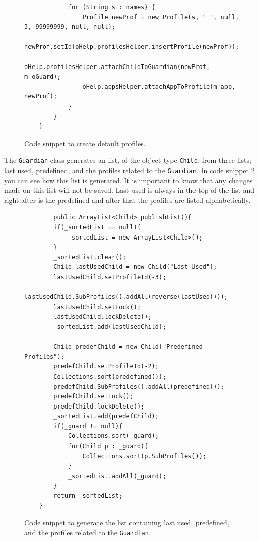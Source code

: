 \begin{description}
\begin{figure}[H]
\begin{lstlisting}
			for (String s : names) {
				Profile newProf = new Profile(s, " ", null, 3, 99999999, null, null);
				newProf.setId(oHelp.profilesHelper.insertProfile(newProf));
				oHelp.profilesHelper.attachChildToGuardian(newProf, m_oGuard);
				oHelp.appsHelper.attachAppToProfile(m_app, newProf);
			}
		}
	}
\end{lstlisting}
\caption{Code snippet to create default profiles.}%
\label{code:createChildren}%
\end{figure}

The \texttt{Guardian} class generates an list, of the object type \texttt{Child}, from three lists; last used, predefined, and the profiles related to the \texttt{Guardian}.
In code snippet \ref{code:publishList} you can see how this list is generated.
It is important to know that any changes made on this list will not be saved.
Last used is always in the top of the list and right after is the predefined and after that the profiles are listed alphabetically.
	
		\begin{figure}[H]
\begin{lstlisting}
		public ArrayList<Child> publishList(){
		if(_sortedList == null){
			_sortedList = new ArrayList<Child>();
		}
		_sortedList.clear();
		Child lastUsedChild = new Child("Last Used");
		lastUsedChild.setProfileId(-3);
		lastUsedChild.SubProfiles().addAll(reverse(lastUsed()));
		lastUsedChild.setLock();
		lastUsedChild.lockDelete();
		_sortedList.add(lastUsedChild);
		
		Child predefChild = new Child("Predefined Profiles");
		predefChild.setProfileId(-2);
		Collections.sort(predefined());
		predefChild.SubProfiles().addAll(predefined());
		predefChild.setLock();
		predefChild.lockDelete();
		_sortedList.add(predefChild);
		if(_guard != null){
			Collections.sort(_guard);
			for(Child p : _guard){
				Collections.sort(p.SubProfiles());
			}
			_sortedList.addAll(_guard);
		}
		return _sortedList;
	}
\end{lstlisting}
\caption{Code snippet to generate the list containing last used, predefined, and the profiles related to the \texttt{Guardian}.}%
\label{code:publishList}%
\end{figure}
	

\end{description}
